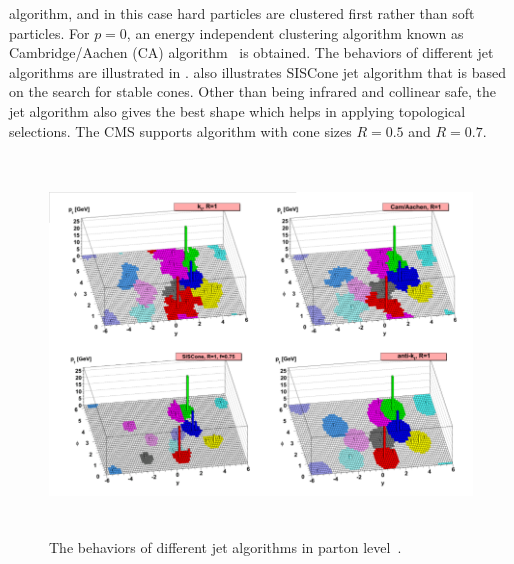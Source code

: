 algorithm, and in this case hard particles are clustered first rather than soft particles. For $p = 0$, an energy independent clustering algorithm  
known as Cambridge/Aachen (CA) algorithm~\cite{Dokshitzer:1997in} is obtained. The behaviors of different jet algorithms are illustrated in 
\fig{\ref{fig:JetClusteringAlgo}}. \Fig{\ref{fig:JetClusteringAlgo}} also illustrates SISCone jet algorithm that is based on the search for stable
cones. Other than being infrared and collinear safe, the \antikt jet algorithm also gives the best shape which helps in applying topological 
selections. The CMS supports \antikt algorithm with cone sizes $R=0.5$ and $R=0.7$.
\begin{figure}[h]
\centering
\includegraphics[width=13cm,height=10cm]{ch4/figures/JetClusteringAlgo.png}
\caption{The behaviors of different jet algorithms in parton level~\cite{Cacciari:2008gp}.}
\label{fig:JetClusteringAlgo}
\end{figure}

